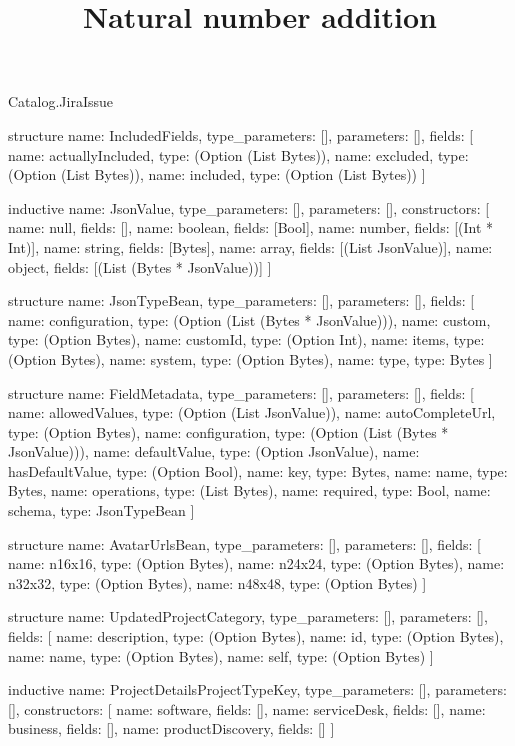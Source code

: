 \begin{lexlean}{Catalog.JiraIssue}
\title{Natural number addition}
\begin{semanticmodule}
structure{
  name: IncludedFields,
  type_parameters: [],
  parameters: [],
  fields: [
    {name: actuallyIncluded, type: (Option (List Bytes))},
    {name: excluded, type: (Option (List Bytes))},
    {name: included, type: (Option (List Bytes))}
  ]
}

inductive{
  name: JsonValue,
  type_parameters: [],
  parameters: [],
  constructors: [
    {name: null, fields: []},
    {name: boolean, fields: [Bool]},
    {name: number, fields: [(Int * Int)]},
    {name: string, fields: [Bytes]},
    {name: array, fields: [(List JsonValue)]},
    {name: object, fields: [(List (Bytes * JsonValue))]}
  ]
}

structure{
  name: JsonTypeBean,
  type_parameters: [],
  parameters: [],
  fields: [
    {name: configuration, type: (Option (List (Bytes * JsonValue)))},
    {name: custom, type: (Option Bytes)},
    {name: customId, type: (Option Int)},
    {name: items, type: (Option Bytes)},
    {name: system, type: (Option Bytes)},
    {name: type, type: Bytes}
  ]
}

structure{
  name: FieldMetadata,
  type_parameters: [],
  parameters: [],
  fields: [
    {name: allowedValues, type: (Option (List JsonValue))},
    {name: autoCompleteUrl, type: (Option Bytes)},
    {name: configuration, type: (Option (List (Bytes * JsonValue)))},
    {name: defaultValue, type: (Option JsonValue)},
    {name: hasDefaultValue, type: (Option Bool)},
    {name: key, type: Bytes},
    {name: name, type: Bytes},
    {name: operations, type: (List Bytes)},
    {name: required, type: Bool},
    {name: schema, type: JsonTypeBean}
  ]
}

structure{
  name: AvatarUrlsBean,
  type_parameters: [],
  parameters: [],
  fields: [
    {name: n16x16, type: (Option Bytes)},
    {name: n24x24, type: (Option Bytes)},
    {name: n32x32, type: (Option Bytes)},
    {name: n48x48, type: (Option Bytes)}
  ]
}

structure{
  name: UpdatedProjectCategory,
  type_parameters: [],
  parameters: [],
  fields: [
    {name: description, type: (Option Bytes)},
    {name: id, type: (Option Bytes)},
    {name: name, type: (Option Bytes)},
    {name: self, type: (Option Bytes)}
  ]
}

inductive{
  name: ProjectDetailsProjectTypeKey,
  type_parameters: [],
  parameters: [],
  constructors: [
    {name: software, fields: []},
    {name: serviceDesk, fields: []},
    {name: business, fields: []},
    {name: productDiscovery, fields: []}
  ]
}


\end{semanticmodule}
\end{lexlean}
